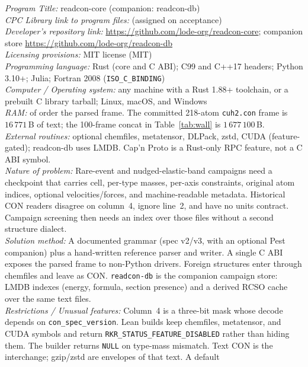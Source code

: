 \documentclass[preprint,12pt]{elsarticle}
\begin{document}
\noindent
\textit{Program Title:} readcon-core (companion: readcon-db)\\
\textit{CPC Library link to program files:} (assigned on acceptance)\\
\textit{Developer's repository link:}
\url{https://github.com/lode-org/readcon-core};
companion store \url{https://github.com/lode-org/readcon-db}\\
\textit{Licensing provisions:} MIT license (MIT)\\
\textit{Programming language:} Rust (core and C ABI); C99 and C++17
headers; Python 3.10+; Julia; Fortran 2008 (\texttt{ISO\_C\_BINDING})\\
\textit{Computer / Operating system:} any machine with a Rust 1.88+
toolchain, or a prebuilt C library tarball; Linux, macOS, and Windows\\
\textit{RAM:} of order the parsed frame. The committed 218-atom
\texttt{cuh2.con} frame is $16\,771$\,B of text; the 100-frame
concat in Table~\ref{tab:wall} is $1\,677\,100$\,B.\\
\textit{External routines:} optional chemfiles, metatensor, DLPack,
zstd, CUDA (feature-gated); readcon-db uses LMDB. Cap'n Proto is a
Rust-only RPC feature, not a C ABI symbol.\\
\textit{Nature of problem:} Rare-event and nudged-elastic-band
campaigns need a checkpoint that carries cell, per-type masses,
per-axis constraints, original atom indices, optional
velocities/forces, and machine-readable metadata. Historical CON
readers disagree on column~4, ignore line~2, and have no units
contract. Campaign screening then needs an index over those files
without a second structure dialect.\\
\textit{Solution method:} A documented grammar (spec v2/v3, with an
optional Pest companion) plus a hand-written reference parser and
writer. A single C ABI exposes the parsed frame to non-Python drivers.
Foreign structures enter through chemfiles and leave as CON.
\texttt{readcon-db} is the companion campaign store: LMDB indexes
(energy, formula, section presence) and a derived RCSO cache over the
same text files.\\
\textit{Restrictions / Unusual features:} Column~4 is a three-bit
mask whose decode depends on \texttt{con\_spec\_version}. Lean
builds keep chemfiles, metatensor, and CUDA symbols and return
\texttt{RKR\_STATUS\_FEATURE\_DISABLED} rather than hiding them. The
builder returns \texttt{NULL} on type-mass mismatch. Text CON is the
interchange; gzip/zstd are envelopes of that text. A default
\end{document}
